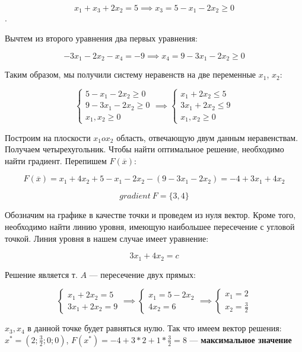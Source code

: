 \documentclass{article}
\begin{document}
$$x_1 + x_3 + 2x_2 = 5 \implies x_3 = 5 - x_1 - 2x_2 \ge 0$$.

Вычтем из второго уравнения два первых уравнения:

$$-3x_1 - 2x_2 - x_4 = -9 \implies x_4 = 9 - 3x_1 - 2x_2 \ge 0$$

Таким образом, мы получили систему неравенств на две переменные $x_1$, $x_2$:

$$
\begin{cases}
    5 - x_1 - 2x_2 \ge 0 \\ 
    9 - 3x_1 - 2x_2 \ge 0 \\
    x_1, x_2 \ge 0
\end{cases} \implies \begin{cases}
    x_1 + 2x_2 \le 5 \\
    3x_1 + 2x_2 \le 9 \\
    x_1, x_2 \ge 0
\end{cases}
$$

Построим на плоскости $x_1 o x_2$ область, отвечающую двум данным неравенствам. Получаем четырехугольник. Чтобы найти оптимальное решение, необходимо найти градиент. Перепишем $F(\overline{x})$:

$$F(\overline{x}) = x_1 + 4x_2 + 5 - x_1 - 2x_2 - (9 - 3x_1 - 2x_2) = -4 + 3x_1 + 4x_2$$

$$gradient \ F = \{ 3, 4 \}$$

Обозначим на графике в качестве точки и проведем из нуля вектор. Кроме того, необходимо найти линию уровня, имеющую наибольшее пересечение с угловой точкой. Линия уровня в нашем случае имеет уравнение:

$$3x_1 + 4x_2 = c$$

Решение является т. $A$ — пересечение двух прямых:

$$
\begin{cases}
    x_1 + 2x_2 = 5 \\
    3x_1 + 2x_2 = 9
\end{cases} \implies \begin{cases}
    x_1 = 5 - 2x_2 \\
    4x_2 = 6
\end{cases} \implies \begin{cases}
    x_1 = 2 \\ 
    x_2 = \frac{3}{2}
\end{cases}
$$

$x_3, x_4$ в данной точке будет равняться нулю. Так что имеем вектор решения: $x^{*} = (2; \frac{3}{2}; 0; 0)$, $F(x^{*}) = -4 + 3 * 2 + 1 * \frac{3}{2} = 8$ — \textbf{максимальное значение}
\end{document}
